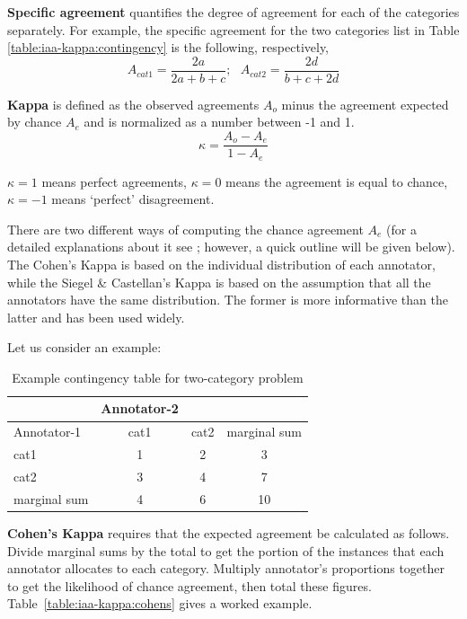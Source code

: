 {\bf Specific agreement} quantifies the degree of agreement for each of the categories 
separately. For example, the specific agreement for the two categories list in 
Table \ref{table:iaa-kappa:contingency} is the following, respectively,
\begin{equation}
A_{cat1} = \frac{2a}{2a+b+c}; \ \ \
A_{cat2} = \frac{2d}{b+c+2d}
\end{equation}

{\bf Kappa} is defined as the observed agreements $A_{o}$ minus the agreement 
expected by chance $A_{e}$ and is normalized as a number between -1 and 1.
\begin{equation}
\kappa =\frac{A_{o}-A_{e}}{1-A_{e}}
\end{equation}

$\kappa=1$ means perfect agreements, $\kappa=0$ means the agreement is equal to 
chance, $\kappa=-1$ means `perfect' disagreement.

There are two different ways of computing the chance agreement $A_{e}$ (for a
detailed explanations about it see \cite{Eugenio04}; however, a quick outline
will be given below). The Cohen's Kappa is based on the individual distribution
of each annotator, while the Siegel \& Castellan's Kappa is based on the
assumption that all the annotators have the same distribution. The former is more
informative than the latter and has been used widely.

Let us consider an example:

\begin{table}[hbt]
{\centering
\begin{tabular}{|l|cc|c|} 
\hline
   & Annotator-2 & & \\
\hline
Annotator-1  & cat1 & cat2 & marginal sum\\
\hline
 cat1& 1 & 2 & 3\\ 
cat2 & 3 & 4 & 7\\
\hline
marginal sum & 4 & 6 &10\\
 \hline
\end{tabular}\par}
\caption{Example contingency table for two-category problem}
\label{table:iaa-kappa:contingencyex}
\end{table}

{\bf Cohen's Kappa} requires that the expected agreement be calculated as
follows. Divide marginal sums by the total to get the portion of the instances
that each annotator allocates to each category. Multiply annotator's
proportions together to get the likelihood of chance agreement, then total
these figures. Table~\ref{table:iaa-kappa:cohens} gives a worked example.

